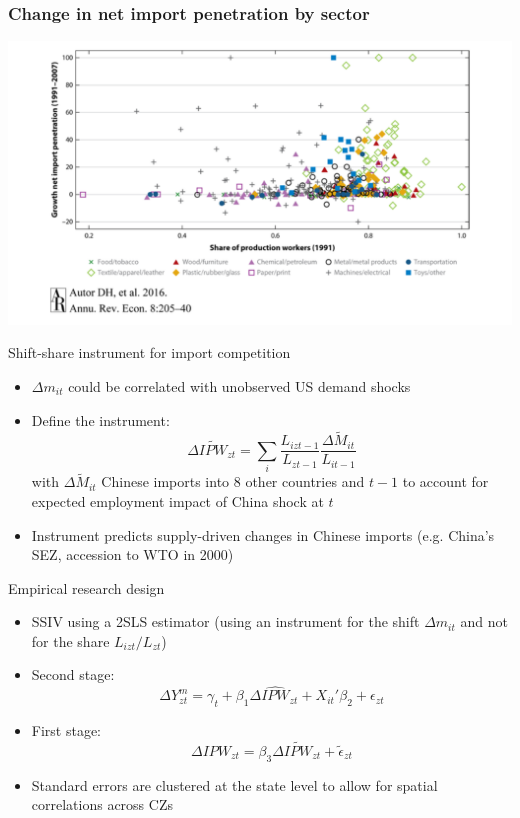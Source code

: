 \documentclass[notes=show]{beamer}
\begin{document}
\begin{frame}
\frametitle{Change in net import penetration by sector}
\begin{center}
\includegraphics[width=\textwidth]{AR-fig-4.pdf}%
\end{center}
\end{frame}

\begin{frame}{Shift-share instrument for import competition}
\begin{itemize}
\item $\Delta m_{it} $ could be correlated with unobserved US demand shocks \medskip
\item Define the instrument:
\begin{equation*}
    \Delta \tilde{IPW}_{zt} = \sum_{i} \frac{L_{izt-1}}{L_{zt-1}} \frac{\Delta \tilde{M}_{it}}{L_{it-1}} \tag{4}
\end{equation*}
with $ \Delta \tilde{M}_{it}$ Chinese imports into 8 other countries and $t-1$ to account for expected employment impact of China shock at $t$ \medskip
\item Instrument predicts supply-driven changes in Chinese imports (e.g. China's SEZ, accession to WTO in 2000)
\end{itemize}
\end{frame}

\begin{frame}{Empirical research design}
\begin{itemize}
\item SSIV using a 2SLS estimator (using an instrument for the shift $\Delta m_{it} $ and not for the share $L_{izt} / L_{zt}$)  \medskip
\item Second stage: 
\begin{equation*}
  \Delta Y_{zt}^m = \gamma_{t} + \beta_{1} \Delta \hat{IPW}_{zt} + X_{it}' \beta_{2} + \epsilon_{zt} \tag{5}
\end{equation*}
\item First stage:
\begin{equation*}
  \Delta IPW_{zt} = \beta_{3} \Delta \tilde{IPW}_{zt} + \tilde{\epsilon}_{zt}
\end{equation*}
\item Standard errors are clustered at the state level to allow for spatial correlations across CZs
\end{itemize}
\end{frame}
\end{document}
